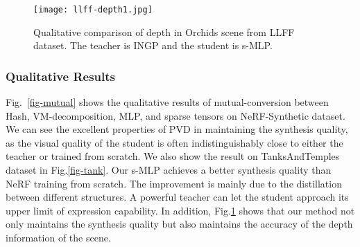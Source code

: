 \documentclass[letterpaper]{article} \usepackage{aaai23}  \usepackage{times}  \usepackage{helvet}  \usepackage{courier}  \usepackage[hyphens]{url}  \usepackage{graphicx} \urlstyle{rm} \def\UrlFont{\rm}  \usepackage{natbib}  \usepackage{caption} \frenchspacing  \setlength{\pdfpagewidth}{8.5in}  \setlength{\pdfpageheight}{11in}  \usepackage{multirow}
\begin{document}
\begin{figure}[ht]
\centering
\texttt{[image: llff-depth1.jpg]} \caption{Qualitative comparison of depth in Orchids scene from LLFF dataset. The teacher is INGP and the student is s-MLP.}
\label{fig-llff-depth}
\end{figure}

\subsubsection{Qualitative Results} Fig.~\ref{fig-mutual} shows the qualitative results of mutual-conversion between Hash, VM-decomposition, MLP, and sparse tensors on NeRF-Synthetic dataset. We can see the excellent properties of PVD in maintaining the synthesis quality, as the visual quality of the student is often indistinguishably close to either the teacher or trained from scratch. We also show the result on TanksAndTemples dataset in Fig.\ref{fig-tank}. Our s-MLP achieves a better synthesis quality than NeRF training from scratch. The improvement is mainly due to the distillation between different structures. A powerful teacher can let the student approach its upper limit of expression capability. In addition, Fig.\ref{fig-llff-depth} shows that our method not only maintains the synthesis quality but also maintains the accuracy of the depth information of the scene.



\begin{table}[h]
\caption{An ablation study of our method. Metrics are averaged over the 8 scenes from  NeRF-Synthetic dataset in the conversion from VM-decomposition to s-MLP.}
\label{table-loss-ablation}
\end{table}
\end{document}
